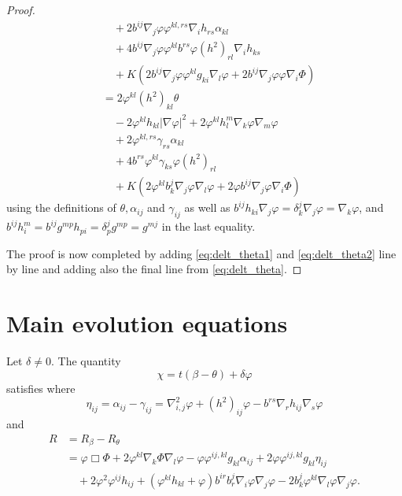 \documentclass{amsart}
\begin{document}
\begin{proof}
\begin{equation}
\begin{split}
&\quad + 2 b^{ij} \nabla_j\varphi \varphi^{kl,rs}\nabla_i h_{rs} \alpha_{kl} \\
&\quad + 4 b^{ij} \nabla_j\varphi \varphi^{kl} b^{rs} \varphi(h^2)_{rl} \nabla_i h_{ks} \\
&\quad + K\left(2 b^{ij} \nabla_j\varphi \varphi^{kl}g_{ki} \nabla_l \varphi + 2 b^{ij} \nabla_j\varphi \varphi \nabla_i \Phi\right) \\
&= 2 \varphi^{kl}(h^2)_{kl}\theta \\
&\quad - 2 \varphi^{kl}h_{kl} |\nabla\varphi|^2 + 2 \varphi^{kl} h^{m}_{l} \nabla_k\varphi \nabla_m \varphi \\
&\quad + 2 \varphi^{kl,rs} \gamma_{rs} \alpha_{kl} \\
&\quad + 4 b^{rs} \varphi^{kl} \gamma_{ks} \varphi(h^2)_{rl} \\
&\quad + K\left(2 \varphi^{kl} b^j_k \nabla_j\varphi \nabla_l \varphi + 2 \varphi b^{ij} \nabla_j\varphi \nabla_i \Phi\right)
\end{split}
\end{equation}
using the definitions of \(\theta, \alpha_{ij}\) and \(\gamma_{ij}\) as well as \(b^{ij}h_{ki} \nabla_j \varphi = \delta^j_k \nabla_j \varphi = \nabla_k \varphi\), and \(b^{ij} h^m_i = b^{ij} g^{mp}h_{pi} = \delta^j_p g^{mp} = g^{mj}\) in the last equality.

The proof is now completed by adding \cref{eq:delt_theta1} and \cref{eq:delt_theta2} line by line and adding also the final line from \cref{eq:delt_theta}.
\end{proof}
\section{Main evolution equations}
\begin{lemma}
\label{thm:Evchi}
Let $\delta \neq 0.$ The quantity
\[
\chi = t(\beta - \theta) + \delta\varphi
\]
satisfies
where
\[
\eta_{ij} = \alpha_{ij} - \gamma_{ij} = \nabla^2_{i,j}\varphi + (h^2)_{ij}\varphi - b^{rs}\nabla_r h_{ij}\nabla_s \varphi
\]
and
\[
\begin{split}
R &= R_{\beta} - R_{\theta} \\
&= \varphi \Box \Phi + 2\varphi^{kl} \nabla_k \Phi \nabla_l \varphi-\varphi \varphi^{ij,kl}g_{kl} \alpha_{ij} + 2\varphi \varphi^{ij,kl}g_{kl} \eta_{ij}  \\
&\quad + 2\varphi^{2}\varphi^{ij}h_{ij} +(\varphi^{kl}h_{kl} + \varphi)b^{ir}b^{j}_{r}\nabla_i \varphi\nabla_j\varphi - 2 b^{j}_{k}\varphi^{kl}\nabla_l\varphi\nabla_j\varphi.
\end{split}
\]

\end{lemma}
\end{document}
